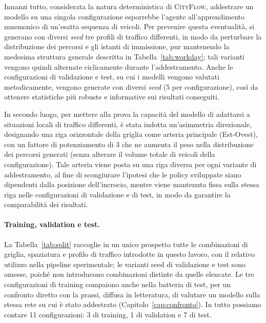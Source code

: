 Innanzi tutto, considerata la natura deterministica di \textsc{CityFlow},
addestrare un modello su una singola configurazione esporrebbe l'agente all'apprendimento mnemonico di un'esatta sequenza di veicoli.
Per prevenire questa eventualità, si generano con diversi \emph{seed} tre profili di traffico differenti, in modo da perturbare
la distribuzione dei percorsi e gli istanti di immissione, pur mantenendo la medesima struttura generale descritta in Tabella~\ref{tab:workday};
tali varianti vengono quindi alternate ciclicamente durante l'addestramento.
Anche le configurazioni di validazione e test, su cui i modelli vengono valutati metodicamente, vengono generate con diversi \emph{seed} (5 per configurazione),
così da ottenere statistiche più robuste e informative sui risultati conseguiti.

In secondo luogo, per mettere alla prova la capacità del modello di adattarsi a situazioni locali di traffico differenti,
è stata indotta un'asimmetria direzionale, designando una riga orizzontale della griglia come arteria principale (Est-Ovest),
con un fattore di potenziamento di 3 che ne aumenta il peso nella distribuzione dei percorsi generati (senza alterare il volume totale di veicoli della configurazione).
Tale arteria viene posta su una riga diversa per ogni variante di addestramento, al fine di scongiurare l'ipotesi che le policy sviluppate siano dipendenti dalla posizione dell'incrocio,
mentre viene mantenuta fissa sulla stessa riga nelle configurazioni di validazione e di test, in modo da garantire la comparabilità dei risultati.

\paragraph{Training, validation e test.} La Tabella~\ref{tab:split}
raccoglie in un unico prospetto tutte le combinazioni di griglia, spaziatura
e profilo di traffico introdotte in questo lavoro, con il relativo utilizzo
nella pipeline sperimentale; le varianti seed di validazione e test sono
omesse, poiché non introducono combinazioni distinte da quelle elencate.
Le tre configurazioni di training compaiono anche nella batteria di test,
per un confronto diretto con la prassi, diffusa in letteratura, di
valutare un modello sulla stessa rete su cui è stato addestrato
(Capitolo~\ref{cap:confronto}). In tutto possiamo contare 11
configurazioni: 3 di training, 1 di validation e 7 di test.


